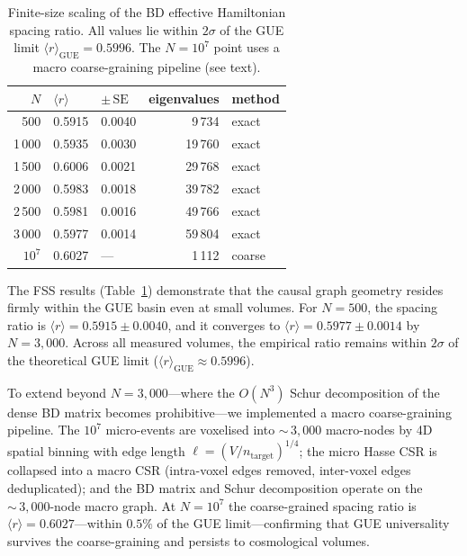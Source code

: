 \documentclass[aps,prd,twocolumn,superscriptaddress,nofootinbib,amsmath,amssymb,longbibliography]{revtex4-2}
\begin{document}
\begin{table}[h]
\centering
\caption{Finite-size scaling of the BD effective Hamiltonian spacing
ratio.  All values lie within $2\sigma$ of the GUE limit
$\langle r \rangle_{\mathrm{GUE}} = 0.5996$.  The $N = 10^{7}$ point
uses a macro coarse-graining pipeline (see text).}
\label{tab:fss-rmt}
\begin{ruledtabular}
\begin{tabular}{r l l r l}
  $N$ & $\langle r \rangle$ & $\pm\,\mathrm{SE}$ & eigenvalues & method \\
  \hline
  500  & 0.5915 & 0.0040 &  9\,734 & exact \\
  1\,000 & 0.5935 & 0.0030 & 19\,760 & exact \\
  1\,500 & 0.6006 & 0.0021 & 29\,768 & exact \\
  2\,000 & 0.5983 & 0.0018 & 39\,782 & exact \\
  2\,500 & 0.5981 & 0.0016 & 49\,766 & exact \\
  3\,000 & 0.5977 & 0.0014 & 59\,804 & exact \\
  $10^{7}$ & 0.6027 & ---    &  1\,112 & coarse \\
\end{tabular}
\end{ruledtabular}
\end{table}

The FSS results (Table~\ref{tab:fss-rmt}) demonstrate that the causal
graph geometry resides firmly within the GUE basin even at small
volumes.  For $N = 500$, the spacing ratio is
$\langle r \rangle = 0.5915 \pm 0.0040$, and it converges to
$\langle r \rangle = 0.5977 \pm 0.0014$ by $N = 3{,}000$.  Across
all measured volumes, the empirical ratio remains within $2\sigma$ of
the theoretical GUE limit
($\langle r \rangle_{\mathrm{GUE}} \approx 0.5996$).

To extend beyond $N = 3{,}000$---where the $O(N^3)$ Schur
decomposition of the dense BD matrix becomes prohibitive---we
implemented a macro coarse-graining pipeline.  The $10^{7}$
micro-events are voxelised into ${\sim}\,3{,}000$ macro-nodes by
4D spatial binning with edge length $\ell = (V/n_{\mathrm{target}})^{1/4}$;
the micro Hasse CSR is collapsed into a macro CSR (intra-voxel
edges removed, inter-voxel edges deduplicated); and the BD matrix
and Schur decomposition operate on the ${\sim}\,3{,}000$-node
macro graph.  At $N = 10^{7}$ the coarse-grained spacing ratio
is $\langle r \rangle = 0.6027$---within $0.5\%$ of the GUE
limit---confirming that GUE universality survives the
coarse-graining and persists to cosmological volumes.
\end{document}
